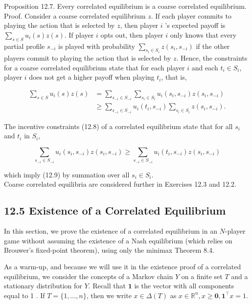 \documentclass[12pt]{article}
\begin{document}
Proposition 12.7. Every correlated equilibrium is a coarse correlated equilibrium.\\
Proof. Consider a coarse correlated equilibrium $z$. If each player commits to playing the action that is selected by $z$, then player $i$ 's expected payoff is $\sum_{s \in S} u_{i}(s) z(s)$. If player $i$ opts out, then player $i$ only knows that every partial profile $s_{-i}$ is played with probability $\sum_{s_{i} \in S_{i}} z\left(s_{i}, s_{-i}\right)$ if the other players commit to playing the action that is selected by $z$. Hence, the constraints for a coarse correlated equilibrium state that for each player $i$ and each $t_{i} \in S_{i}$, player $i$ does not get a higher payoff when playing $t_{i}$, that is,


\begin{align*}
\sum_{s \in S} u_{i}(s) z(s) & =\sum_{s_{-i} \in S_{-i}} \sum_{s_{i} \in S_{i}} u_{i}\left(s_{i}, s_{-i}\right) z\left(s_{i}, s_{-i}\right)  \tag{12.9}\\
& \geq \sum_{s_{-i} \in S_{-i}} u_{i}\left(t_{i}, s_{-i}\right) \sum_{s_{i} \in S_{i}} z\left(s_{i}, s_{-i}\right) .
\end{align*}


The incentive constraints (12.8) of a correlated equilibrium state that for all $s_{i}$ and $t_{i}$ in $S_{i}$,


\begin{equation*}
\sum_{s_{-i} \in S_{-i}} u_{i}\left(s_{i}, s_{-i}\right) z\left(s_{i}, s_{-i}\right) \geq \sum_{s_{-i} \in S_{-i}} u_{i}\left(t_{i}, s_{-i}\right) z\left(s_{i}, s_{-i}\right) \tag{12.10}
\end{equation*}


which imply (12.9) by summation over all $s_{i} \in S_{i}$.\\
Coarse correlated equilibria are considered further in Exercises 12.3 and 12.2.

\subsection*{12.5 Existence of a Correlated Equilibrium}
In this section, we prove the existence of a correlated equilibrium in an $N$-player game without assuming the existence of a Nash equilibrium (which relies on Brouwer's fixed-point theorem), using only the minimax Theorem 8.4.

As a warm-up, and because we will use it in the existence proof of a correlated equilibrium, we consider the concepts of a Markov chain $Y$ on a finite set $T$ and a stationary distribution for $Y$. Recall that $\mathbf{1}$ is the vector with all components equal to 1 . If $T=\{1, \ldots, n\}$, then we write $x \in \Delta(T)$ as $x \in \mathbb{R}^{n}, x \geq \mathbf{0}, \mathbf{1}^{\top} x=1$.
\end{document}

